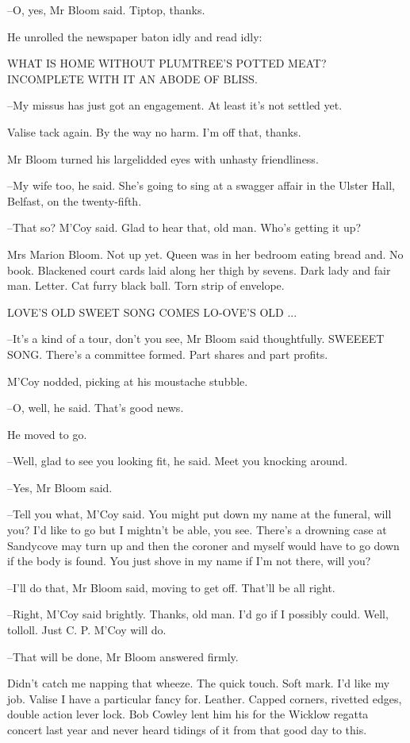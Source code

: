 --O, yes, Mr Bloom said. Tiptop, thanks.

He unrolled the newspaper baton idly and read idly:


    WHAT IS HOME WITHOUT
    PLUMTREE'S POTTED MEAT?
    INCOMPLETE
    WITH IT AN ABODE OF BLISS.


--My missus has just got an engagement. At least it's not settled yet.

Valise tack again. By the way no harm. I'm off that, thanks.

Mr Bloom turned his largelidded eyes with unhasty friendliness.

--My wife too, he said. She's going to sing at a swagger affair in the
Ulster Hall, Belfast, on the twenty-fifth.

--That so? M'Coy said. Glad to hear that, old man. Who's getting it up?

Mrs Marion Bloom. Not up yet. Queen was in her bedroom eating bread and.
No book. Blackened court cards laid along her thigh by sevens. Dark lady
and fair man. Letter. Cat furry black ball. Torn strip of envelope.


    LOVE'S
    OLD
    SWEET
    SONG
    COMES LO-OVE'S OLD ...


--It's a kind of a tour, don't you see, Mr Bloom said thoughtfully.
SWEEEET SONG.  There's a committee formed. Part shares and part profits.

M'Coy nodded, picking at his moustache stubble.

--O, well, he said. That's good news.

He moved to go.

--Well, glad to see you looking fit, he said. Meet you knocking around.

--Yes, Mr Bloom said.

--Tell you what, M'Coy said. You might put down my name at the funeral,
will you? I'd like to go but I mightn't be able, you see. There's a
drowning case at Sandycove may turn up and then the coroner and myself
would have to go down if the body is found. You just shove in my name if
I'm not there, will you?

--I'll do that, Mr Bloom said, moving to get off. That'll be all right.

--Right, M'Coy said brightly. Thanks, old man. I'd go if I possibly
could. Well, tolloll. Just C. P. M'Coy will do.

--That will be done, Mr Bloom answered firmly.

Didn't catch me napping that wheeze. The quick touch. Soft mark. I'd like
my job. Valise I have a particular fancy for. Leather. Capped corners,
rivetted edges, double action lever lock. Bob Cowley lent him his for the
Wicklow regatta concert last year and never heard tidings of it from that
good day to this.

